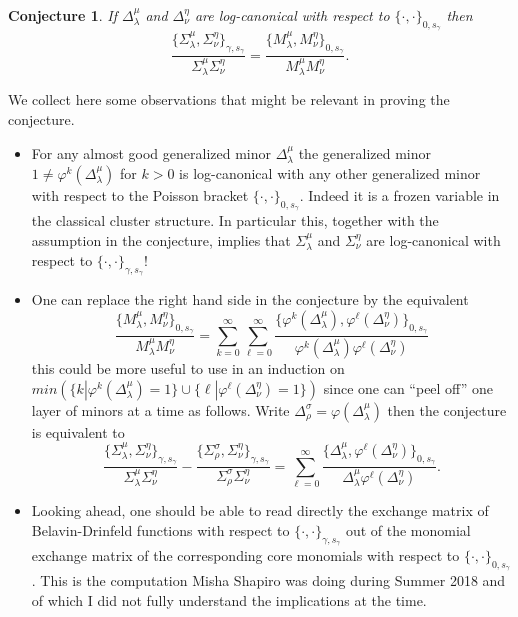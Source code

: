 \documentclass[a4paper]{amsart}
\newtheorem{conjecture}[theorem]{Conjecture}
\theoremstyle{definition}
\begin{document}
\begin{conjecture}
  If $\Delta_\lambda^\mu$ and $\Delta_\nu^\eta$ are log-canonical with respect to $\{\cdot,\cdot\}_{0,s_\gamma}$ then
  \[
    \frac{\{\Sigma_\lambda^\mu,\Sigma_\nu^\eta\}_{\gamma,s_\gamma}}{\Sigma_\lambda^\mu \Sigma_\nu^\eta} 
    = 
    \frac{\{M_\lambda^\mu,M_\nu^\eta\}_{0,s_\gamma}}{M_\lambda^\mu M_\nu^\eta}.
  \]
\end{conjecture}

We collect here some observations that might be relevant in proving the conjecture.
\begin{itemize}
  \item
   For any almost good generalized minor $\Delta_\lambda^\mu$ the generalized minor $1\neq\varphi^k(\Delta_\lambda^\mu)$ for $k>0$ is log-canonical with any other generalized minor with respect to the Poisson bracket $\{\cdot,\cdot\}_{0,s_\gamma}$.
   Indeed it is a frozen variable in the classical cluster structure.
   In particular this, together with the assumption in the conjecture, implies that $\Sigma_\lambda^\mu$ and $\Sigma_\nu^\eta$ are log-canonical with respect to $\{\cdot,\cdot\}_{\gamma,s_\gamma}$!

 \item
   One can replace the right hand side in the conjecture by the equivalent
   \[
     \frac{\{M_\lambda^\mu,M_\nu^\eta\}_{0,s_\gamma}}{M_\lambda^\mu M_\nu^\eta}
     =
     \sum_{k=0}^\infty\sum_{\ell=0}^\infty \frac{\{\varphi^k(\Delta_\lambda^\mu),\varphi^\ell(\Delta_\nu^\eta)\}_{0,s_\gamma}}{\varphi^k(\Delta_\lambda^\mu)\varphi^\ell(\Delta_\nu^\eta)}
   \]
   this could be more useful to use in an induction on $min(\{k | \varphi^k(\Delta_\lambda^\mu)=1\}\cup \{\ell | \varphi^\ell(\Delta_\nu^\eta)=1\} )$ since one can ``peel off'' one layer of minors at a time as follows.
   Write $\Delta_\rho^\sigma = \varphi(\Delta_\lambda^\mu)$ then the conjecture is equivalent to
   \[
     \frac{\{\Sigma_\lambda^\mu,\Sigma_\nu^\eta\}_{\gamma,s_\gamma}}{\Sigma_\lambda^\mu \Sigma_\nu^\eta}
     -
     \frac{\{\Sigma_\rho^\sigma,\Sigma_\nu^\eta\}_{\gamma,s_\gamma}}{\Sigma_\rho^\sigma \Sigma_\nu^\eta}
     =
     \sum_{\ell=0}^\infty \frac{\{\Delta_\lambda^\mu,\varphi^\ell(\Delta_\nu^\eta)\}_{0,s_\gamma}}{\Delta_\lambda^\mu\varphi^\ell(\Delta_\nu^\eta)}
     .
   \]

 \item
   Looking ahead, one should be able to read directly the exchange matrix of Belavin-Drinfeld functions with respect to $\{\cdot,\cdot\}_{\gamma,s_\gamma}$ out of the monomial exchange matrix of the corresponding core monomials with respect to $\{\cdot,\cdot\}_{0,s_\gamma}$.
   This is the computation Misha Shapiro was doing during Summer 2018 and of which I did not fully understand the implications at the time.
\end{itemize}
\end{document}
